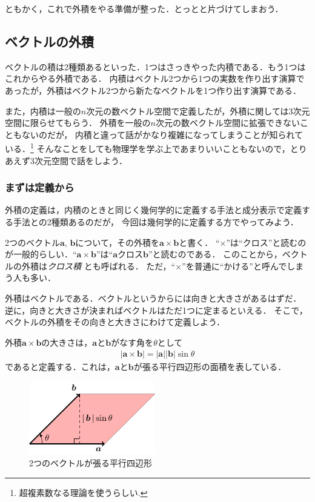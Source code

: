 ともかく，これで外積をやる準備が整った．とっとと片づけてしまおう．
\subsection{ベクトルの外積}
ベクトルの積は2種類あるといった．1つはさっきやった内積である．もう1つはこれからやる外積である．
内積はベクトル2つから1つの実数を作り出す演算であったが，外積はベクトル2つから新たなベクトルを1つ作り出す演算である．

また，内積は一般の$n$次元の数ベクトル空間で定義したが，外積に関しては3次元空間に限らせてもらう．
外積を一般の$n$次元の数ベクトル空間に拡張できないこともないのだが，
内積と違って話がかなり複雑になってしまうことが知られている．\footnote{超複素数なる理論を使うらしい.}
そんなことをしても物理学を学ぶ上であまりいいこともないので，とりあえず3次元空間で話をしよう．
\subsubsection{まずは定義から}
外積の定義は，内積のときと同じく幾何学的に定義する手法と成分表示で定義する手法との2種類あるのだが，
今回は幾何学的に定義する方でやってみよう．

2つのベクトル$\bm{a}, \, \bm{b}$について，その外積を$\bm{a} \times \bm{b}$と書く．
``$\times$''は``クロス''と読むのが一般的らしい．``$\bm{a} \times \bm{b}$''は``$\bm{a}$クロス$\bm{b}$''と読むのである．
このことから，ベクトルの外積は\emph{クロス積}
とも呼ばれる．
ただ，``$\times$''を普通に``かける''と呼んでしまう人も多い．


外積はベクトルである．ベクトルというからには向きと大きさがあるはずだ．
逆に，向きと大きさが決まればベクトルはただ1つに定まるといえる．
そこで，ベクトルの外積をその向きと大きさにわけて定義しよう．

外積$\bm{a} \times \bm{b}$の大きさは，$\bm{a}$と$\bm{b}$がなす角を$\theta$として
\begin{align}
\lvert \bm{a} \times \bm{b} \rvert = \lvert \bm{a} \rvert \lvert \bm{b} \rvert \sin \theta 
\label{eq:gaisekiookisa}
\end{align}
であると定義する．これは，$\bm{a}$と$\bm{b}$が張る平行四辺形の面積を表している．
\begin{figure}[h]
 \centering
 \includegraphics[width=5.5cm]{picture/vecter2.pdf}
 \caption{2つのベクトルが張る平行四辺形}
\end{figure}

